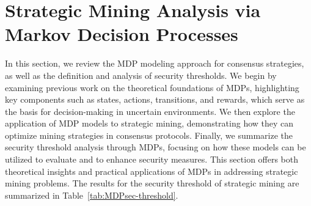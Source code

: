 \section{Strategic Mining Analysis via Markov Decision Processes}
\label{sec:MDP}

\begin{table*}[ht]
\centering
\large %
\caption{Studies on security threshold of blockchain consensus using Markov Decision Process}
\label{tab:MDPsec-threshold}
\end{table*}


In this section, we review the MDP modeling approach for consensus strategies, as well as the definition and analysis of security thresholds. 
We begin by examining previous work on the theoretical foundations of MDPs, highlighting key components such as states, actions, transitions, and rewards, which serve as the basis for decision-making in uncertain environments. 
We then explore the application of MDP models to strategic mining, demonstrating how they can optimize mining strategies in consensus protocols. 
Finally, we summarize the security threshold analysis through MDPs, focusing on 
how these models can be utilized to evaluate and to enhance security measures.
This section offers both theoretical insights and practical applications of MDPs in addressing strategic mining problems.
The results for the security threshold of strategic mining are summarized in Table~\ref{tab:MDPsec-threshold}. 

